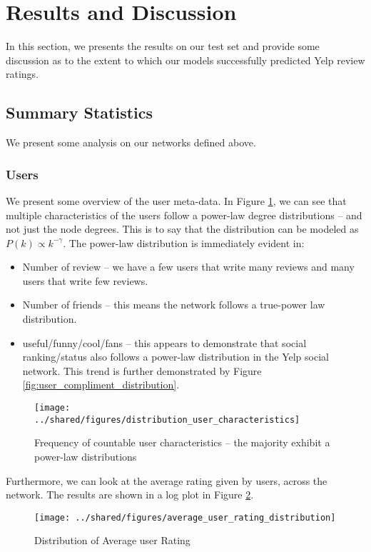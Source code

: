 \documentclass[letterpaper, 10 pt, conference]{ieeeconf}  %
\begin{document}
\section{Results and Discussion}
In this section, we presents the results on our test set and provide some discussion as to the extent to which our models successfully predicted Yelp review ratings.

\subsection{Summary Statistics}
We present some analysis on our networks defined above. 

\subsubsection{Users}
We present some overview of the user meta-data. In Figure \ref{fig:user_characteristics}, we can see that multiple characteristics of the users follow a power-law degree distributions -- and not just the node degrees. This is to say that the distribution can be modeled as $P(k) \propto k^{-\gamma}$. The power-law distribution is immediately evident in:

\begin{itemize}
\item Number of review -- we have a few users that write many reviews and many users that write few reviews.
\item Number of friends -- this means the network follows a true-power law distribution.
\item useful/funny/cool/fans -- this appears to demonstrate that social ranking/status also follows a power-law distribution in the Yelp social network. This trend is further demonstrated by Figure \ref{fig:user_compliment_distribution}.
\end{itemize} 

\begin{figure}[h!]
\centering
\texttt{[image: ../shared/figures/distribution\_user\_characteristics]}
\caption{Frequency of countable user characteristics -- the majority exhibit a power-law distributions}
\label{fig:user_characteristics}
\end{figure}

Furthermore, we can look at the average rating given by users, across the network. The results are shown in a log plot in Figure \ref{fig:user_rating_distribution}.

\begin{figure}[h!]
\centering
\texttt{[image: ../shared/figures/average\_user\_rating\_distribution]}
\caption{Distribution of Average user Rating}
\label{fig:user_rating_distribution}
\end{figure}
\end{document}
